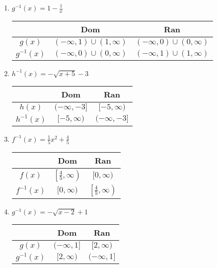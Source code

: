 \begin{enumerate}
     \item $g^{-1}(x) = 1 - \frac{1}{x}$  \newline\\
\begin{tabular}{c|c|c}
            &   Dom             &   Ran \\  \hline
    $g(x)$  &   $(-\infty,1)\cup(1,\infty)$    &   $(-\infty,0)\cup(0,\infty)$   \\  \hline
    $g^{-1}(x)$ &   $(-\infty,0)\cup(0,\infty)$   &   $(-\infty,1)\cup(1,\infty)$    \\
\end{tabular}

\item $h^{-1}(x) = -\sqrt{x+5}-3$ \newline\\ 
\begin{tabular}{c|c|c}
            &   Dom             &   Ran \\  \hline
    $h(x)$  &   $(-\infty,-3]$    &   $[-5,\infty)$   \\  \hline
    $h^{-1}(x)$ &   $[-5,\infty)$   &   $(-\infty,-3]$    \\
\end{tabular}

\item $f^{-1}(x) = \frac{1}{5}x^2 + \frac{4}{5}$    \newline\\
    \setlength{\extrarowheight}{5pt}
    \begin{tabular}{c|c|c}
            &   Dom &   Ran \\  \hline
        $f(x)$  &   $\left[\frac{4}{5}, \infty\right)$  &   $[0, \infty)$    \\[5pt]  \hline
        $f^{-1}(x)$ &   $[0, \infty)$   &   $\left[\frac{4}{5}, \infty\right)$  \\
    \end{tabular}
    
\item $g^{-1}(x) = -\sqrt{x-2}+1$   \newline\\
    \setlength{\extrarowheight}{5pt}
    \begin{tabular}{c|c|c}
            &   Dom &   Ran \\  \hline
        $g(x)$  &   $(-\infty, 1]$  &   $[2, \infty)$    \\[5pt]  \hline
        $g^{-1}(x)$ &   $[2, \infty)$   &   $(-\infty, 1]$  \\
    \end{tabular}
    

\end{enumerate}
